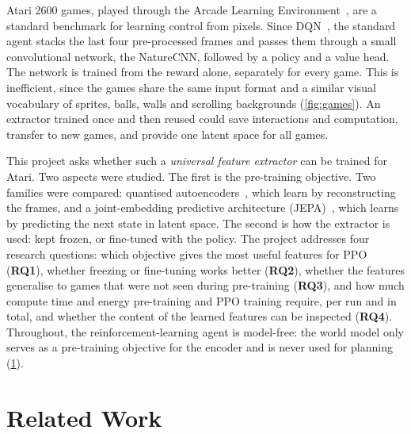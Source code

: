 \documentclass[runningheads,a4paper]{llncs}
\begin{document}
Atari 2600 games, played through the Arcade Learning Environment~\cite{machado2018revisiting},
are a standard benchmark for learning control from pixels. Since
DQN~\cite{mnih2015human}, the standard agent stacks the last four pre-processed frames and
passes them through a small convolutional network, the NatureCNN, followed by a policy and a
value head. The network is trained from the reward alone, separately for every game. This is
inefficient, since the games share the same input
format and a similar visual vocabulary of sprites, balls, walls and scrolling backgrounds
(\cref{fig:games}). An extractor trained once and then reused could save interactions and computation,
transfer to new games, and provide one latent space for all games.

This project asks whether such a \emph{universal feature
extractor} can be trained for Atari. Two aspects were studied. The first is the pre-training objective. Two families were compared: quantised
autoencoders~\cite{vandenoord2017vqvae,mentzer2024fsq}, which learn by reconstructing the
frames, and a joint-embedding predictive architecture
(JEPA)~\cite{lecun2022path,assran2023ijepa,bardes2024vjepa}, which learns by predicting the
next state in latent space. The second is how the extractor is used: kept frozen, or fine-tuned with the policy. The
project addresses four research questions: which objective gives the most useful features for PPO (\textbf{RQ1}), whether
freezing or fine-tuning works better (\textbf{RQ2}), whether the features generalise to games
that were not seen during pre-training (\textbf{RQ3}), and how much compute time and energy
pre-training and PPO training require, per run and in total, and whether the content of the
learned features can be inspected (\textbf{RQ4}). Throughout, the reinforcement-learning agent is model-free:
the world model only serves as a pre-training objective for the encoder and is never used for
planning (\cref{sec:related}).

\section{Related Work}
\label{sec:related}
\end{document}
